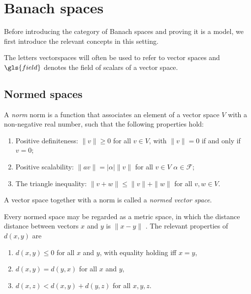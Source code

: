 \section{Banach spaces}

Before introducing the category of Banach spaces and proving it is a model, we first introduce the relevant concepts in this setting. 

The letters \gls{vectorspaces} will often be used to refer to vector spaces and $\gls{field}$ denotes the field of scalars of a vector space.



\subsection{Normed spaces}

\begin{definition} \label{def:norm}
  A \emph{norm} \gls{norm} is a function that associates an element of a vector space $V$ with a non-negative real number, such that the following properties hold:
  \begin{enumerate}
    \item Positive definiteness: $\|v\| \geq 0$ for all $v \in V$, with $\|v\| = 0$ if and only if $v = 0$;
    \item Positive scalability: $\|av\| = |\alpha|\|v\|$ for all $v \in V$  $\alpha \in \mathcal{F}$;
    \item The triangle inequality: $\|v + w\| \leq \|v\| + \|w\|$ for all $v, w \in V$.
  \end{enumerate}
\end{definition}

\begin{definition} \label{def:normed_space}
A vector space together with a norm is called a \emph{normed vector space}.
\end{definition}


Every normed space may be regarded as a metric space, in which the
distance \gls{distance} between vectors $x$ and $y$ is $\|x-y\|$ . The relevant properties of $d(x,y)$ are

\begin{enumerate}
  \item $ d(x, y) \leq 0 $ for all $x$ and $y$, with equality holding iff $x = y$,
  \item $d(x, y) = d(y, x)$ for all $x$ and $y$,
  \item $d(x, z) < d(x, y) + d(y, z)$ for all $x, y, z$.
\end{enumerate}

